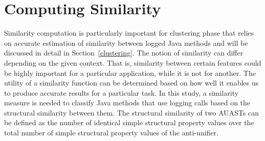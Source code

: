 




\section{Computing Similarity} \label{meth-similarity}
Similarity computation is particularly important for clustering phase that relies on accurate estimation of similarity between logged Java methods and will be discussed in detail in Section~\ref{clustering}. The notion of similarity can differ depending on the given context. That is, similarity between certain features could be highly important for a particular application, while it is not for another. The utility of a similarity function can be determined based on how well it enables us to produce accurate results for a particular task. In this study, a similarity measure is needed to classify Java methods that use logging calls based on the structural similarity between them. The structural similarity of two AUASTs can be defined as the number of identical simple structural property values over the total number of simple structural property values of the anti-unifier.

